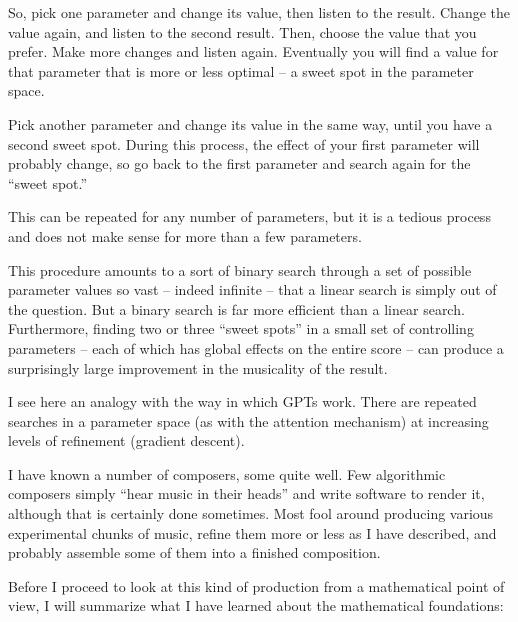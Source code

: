 \documentclass[11pt]{amsart}
\begin{document}
So, pick one parameter and change its value, then listen to the result. Change the value again, and listen to the second result. Then, choose the value that you prefer. Make more changes and listen again. Eventually you will find a value for that parameter that is more or less optimal – a sweet spot in the parameter space.

Pick another parameter and change its value in the same way, until you have a second sweet spot. During this process, the effect of your first parameter will probably change, so go back to the first parameter and search again for the “sweet spot.”

This can be repeated for any number of parameters, but it is a tedious process and does not make sense for more than a few parameters.

This procedure amounts to a sort of binary search through a set of possible parameter values so vast – indeed infinite – that a linear search is simply out of the question. But a binary search is far more efficient than a linear search. Furthermore, finding two or three ``sweet spots'' in a small set of controlling parameters – each of which has global effects on the entire score – can produce a surprisingly large improvement in the musicality of the result.

I see here an analogy with the way in which GPTs work. There are repeated searches in a parameter space (as with the attention mechanism) at increasing levels of refinement (gradient descent).

I have known a number of composers, some quite well. Few algorithmic composers simply ``hear music in their heads'' and write software to render it, although that is certainly done sometimes. Most fool around producing various experimental chunks of music, refine them more or less as I have described, and probably assemble some of them into a finished composition.

Before I proceed to look at this kind of production from a mathematical point of view, I will summarize what I have learned about the mathematical foundations:
\end{document}
